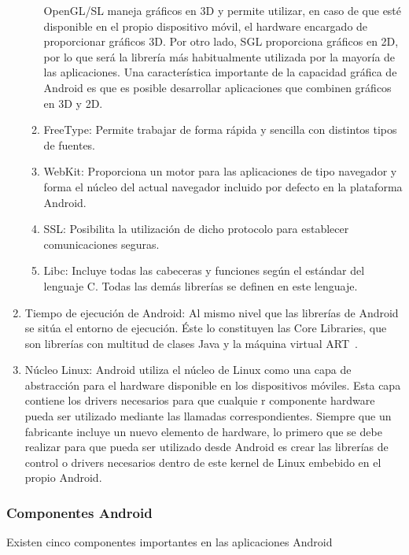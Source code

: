 \begin{enumerate}
\begin{enumerate}
 OpenGL/SL maneja gráficos en 3D y permite utilizar,
 en caso de que esté disponible en el propio dispositivo móvil,
 el hardware encargado de proporcionar gráficos 3D.
 Por otro lado, SGL proporciona gráficos en 2D,
 por lo que será la librería más habitualmente utilizada por
 la mayoría de las aplicaciones. Una característica importante
 de la capacidad gráfica de Android es que es posible 
desarrollar aplicaciones que combinen gráficos en 3D y 2D.
\item	FreeType: Permite trabajar de forma rápida y
 sencilla con distintos tipos de fuentes.
\item	WebKit: Proporciona un motor para las aplicaciones
 de tipo navegador y forma el núcleo del actual navegador
 incluido por defecto en la plataforma Android.
\item	SSL: Posibilita la utilización de dicho protocolo para
 establecer comunicaciones seguras.
\item	Libc: Incluye todas las cabeceras y funciones según
 el estándar del lenguaje C. Todas las demás librerías se 
definen en este lenguaje.
\end{enumerate}
\item	Tiempo de ejecución de Android: Al mismo nivel que las
 librerías de Android se sitúa el entorno de ejecución.
 Éste lo constituyen las Core Libraries, que son librerías con
 multitud de clases Java y la máquina virtual ART~\cite{ART}.
\item Núcleo Linux: Android utiliza el núcleo de Linux como una 
capa de abstracción para el hardware disponible en los dispositivos
 móviles. Esta capa contiene los drivers necesarios para que cualquie
r componente hardware pueda ser utilizado mediante las llamadas
 correspondientes. Siempre que un fabricante incluye un nuevo
 elemento de hardware, lo primero que se debe realizar para que 
pueda ser utilizado desde Android es crear las librerías de control
 o drivers necesarios dentro de este kernel de Linux embebido 
en el propio Android. 
\end{enumerate}
\subsubsection{Componentes Android}
Existen cinco componentes importantes en las aplicaciones Android

